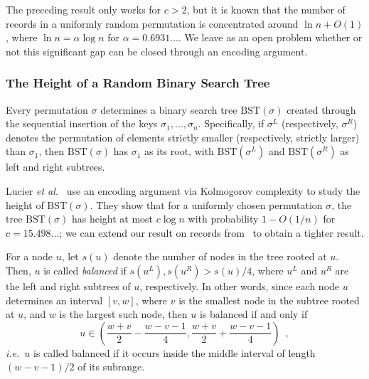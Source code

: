 \documentclass[prodmode,acmcsur]{acmsmall}
\begin{document}
\begin{rem}
  The preceding result only works for $c > 2$, but it is  known
  that the number of records in a uniformly random permutation is
  concentrated around $\ln n + O(1)$, where $\ln n = \alpha \log n$
  for $\alpha = 0.6931\dots$. We leave as an open problem whether or not
  this significant gap can be closed through an encoding argument.
\end{rem}

\subsubsection{The Height of a Random Binary Search Tree}

Every permutation $\sigma$ determines a binary search tree
$\text{BST}(\sigma)$ created through the sequential insertion of the
keys $\sigma_1, \ldots, \sigma_n$. Specifically, if $\sigma^L$
(respectively, $\sigma^R$) denotes the permutation of elements
strictly smaller (respectively, strictly larger) than $\sigma_1$, then
$\text{BST}(\sigma)$ has $\sigma_1$ as its root, with
$\text{BST}(\sigma^L)$ and $\text{BST}(\sigma^R)$ as left and right
subtrees.

Lucier \emph{et al.}~\cite{lucier.jiang.li:quicksort} use an encoding
argument via Kolmogorov complexity to study the height of
$\text{BST}(\sigma)$. They show that for a uniformly chosen
permutation $\sigma$, the tree $\text{BST}(\sigma)$ has height at most
$c \log n$ with probability $1 - O(1/n)$ for $c = 15.498\dots$; we can
extend our result on records from~ to obtain a 
tighter result.

For a node $u$, let $s(u)$ denote the number of nodes in the tree
rooted at $u$. Then, $u$ is called \emph{balanced} if
$s(u^L), s(u^R) > s(u)/4$, where $u^L$ and $u^R$ are the left and
right subtrees of $u$, respectively. In other words, since each node
$u$ determines an interval $[v, w]$, where $v$ is the smallest node in
the subtree rooted at $u$, and $w$ is the largest such node, then $u$
is balanced if and only if
\[
  u \in \left(\frac{w + v}{2} - \frac{w - v - 1}{4}, \frac{w + v}{2} + \frac{w - v - 1}{4}\right) \enspace ,
\]
\emph{i.e.}~$u$ is called balanced if it occurs inside the middle interval
of length $(w - v - 1)/2$ of its subrange.
\end{document}

